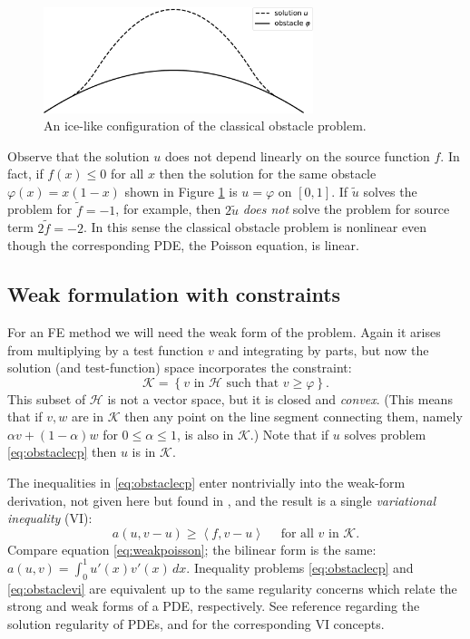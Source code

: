 \documentclass[letterpaper,final,12pt,reqno]{amsart}
\newcommand{\ip}[2]{\left<#1,#2\right>}
\numberwithin{equation}{section}
\numberwithin{figure}{section}
\numberwithin{table}{section}
\begin{document}
\begin{figure}
\includegraphics[width=0.7\textwidth]{fixfigs/icelike.pdf}
\caption{An ice-like configuration of the classical obstacle problem.}
\label{fig:icelike}
\end{figure}

Observe that the solution $u$ does not depend linearly on the source function $f$.  In fact, if $f(x)\le 0$ for all $x$ then the solution for the same obstacle $\varphi(x)=x(1-x)$ shown in Figure \ref{fig:icelike} is $u=\varphi$ on $[0,1]$.  If $\tilde u$ solves the problem for $\tilde f= -1$, for example, then $2\tilde u$ \emph{does not} solve the problem for source term $2\tilde f = -2$.  In this sense the classical obstacle problem is nonlinear even though the corresponding PDE, the Poisson equation, is linear.

\subsection*{Weak formulation with constraints}  For an FE method we will need the weak form of the problem.  Again it arises from multiplying by a test function $v$ and integrating by parts, but now the solution (and test-function) space incorporates the constraint:
\begin{equation}
\mathcal{K} = \left\{v \text{ in } \mathcal{H} \text{ such that } v \ge \varphi\right\}.  \label{eq:Kdefine}
\end{equation}
This subset of $\mathcal{H}$ is not a vector space, but it is closed and \emph{convex}.  (This means that if $v,w$ are in $\mathcal{K}$ then any point on the line segment connecting them, namely $\alpha v + (1-\alpha) w$ for $0 \le \alpha \le 1$, is also in $\mathcal{K}$.)  Note that if $u$ solves problem \eqref{eq:obstaclecp} then $u$ is in $\mathcal{K}$.

The inequalities in \eqref{eq:obstaclecp} enter nontrivially into the weak-form derivation, not given here but found in \cite{Bueler2021,KinderlehrerStampacchia1980}, and the result is a single \emph{variational inequality} (VI):
\begin{equation}
  a(u,v-u) \ge \ip{f}{v-u} \quad \text{ for all } v \text{ in } \mathcal{K}. \label{eq:obstaclevi}
\end{equation}
Compare equation \eqref{eq:weakpoisson}; the bilinear form is the same: $a(u,v) = \int_0^1 u'(x) v'(x)\,dx$.  Inequality problems \eqref{eq:obstaclecp} and \eqref{eq:obstaclevi} are equivalent up to the same regularity concerns which relate the strong and weak forms of a PDE, respectively.  See reference \cite{Evans2010} regarding the solution regularity of PDEs, and \cite{KinderlehrerStampacchia1980} for the corresponding VI concepts.
\end{document}
